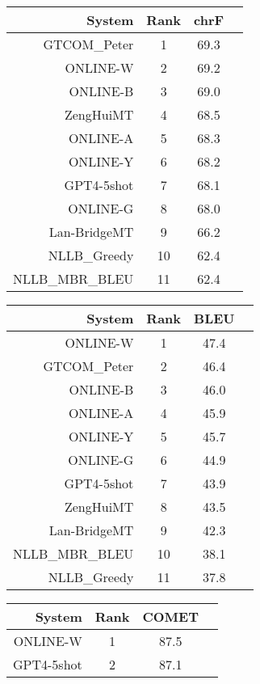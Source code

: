 \documentclass[11pt]{article}
\begin{document}
\begin{table}  
\scriptsize\begin{subtable}[t]{0.33\textwidth}
\begin{tabular}{rccc}
\toprule 
System & Rank & chrF \\ 
\midrule 
GTCOM\_Peter & 1 & 69.3 \\ 
ONLINE-W & 2 & 69.2 \\ 
ONLINE-B & 3 & 69.0 \\ 
ZengHuiMT & 4 & 68.5 \\ 
ONLINE-A & 5 & 68.3 \\ 
ONLINE-Y & 6 & 68.2 \\ 
GPT4-5shot & 7 & 68.1 \\ 
ONLINE-G & 8 & 68.0 \\ 
Lan-BridgeMT & 9 & 66.2 \\ 
NLLB\_Greedy & 10 & 62.4 \\ 
NLLB\_MBR\_BLEU & 11 & 62.4 \\ 
\bottomrule 
\end{tabular} 
\end{subtable} 
\begin{subtable}[t]{0.33\textwidth}
\begin{tabular}{rccc}
\toprule 
System & Rank & BLEU \\ 
\midrule 
ONLINE-W & 1 & 47.4 \\ 
GTCOM\_Peter & 2 & 46.4 \\ 
ONLINE-B & 3 & 46.0 \\ 
ONLINE-A & 4 & 45.9 \\ 
ONLINE-Y & 5 & 45.7 \\ 
ONLINE-G & 6 & 44.9 \\ 
GPT4-5shot & 7 & 43.9 \\ 
ZengHuiMT & 8 & 43.5 \\ 
Lan-BridgeMT & 9 & 42.3 \\ 
NLLB\_MBR\_BLEU & 10 & 38.1 \\ 
NLLB\_Greedy & 11 & 37.8 \\ 
\bottomrule 
\end{tabular} 
\end{subtable} 
\begin{subtable}[t]{0.33\textwidth}
\begin{tabular}{rccc}
\toprule 
System & Rank & COMET \\ 
\midrule 
ONLINE-W & 1 & 87.5 \\ 
GPT4-5shot & 2 & 87.1 \\ 

\end{tabular}
\end{subtable}
\end{table}
\end{document}
